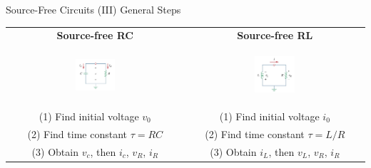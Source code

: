 \documentclass{beamer}
\begin{document}
\begin{frame}{Source-Free Circuits (III) General Steps}


\begin{table}[]
    \centering
        
    \begin{tabular}{c|c}
        \textbf{Source-free RC} & \textbf{Source-free RL}\\
        \begin{figure}
        \centering
        \includegraphics[width=0.35\textwidth]{img_1order/1_source-free_RC.jpg}
        \end{figure}
        &
        \begin{figure}
        \centering
        \includegraphics[width=0.35\textwidth]{img_1order/2_source-free_RL.jpg}
        \end{figure}
        \\
        (1) Find initial voltage $v_0$ & (1) Find initial voltage $i_0$\\
        (2) Find time constant $\tau=RC$ & (2) Find time constant $\tau=L/R$\\
        (3) Obtain $v_c$, then $i_c$, $v_R$, $i_R$ & (3) Obtain $i_L$, then $v_L$, $v_R$, $i_R$\\
    \end{tabular}
\end{table}

\end{frame}
\end{document}
